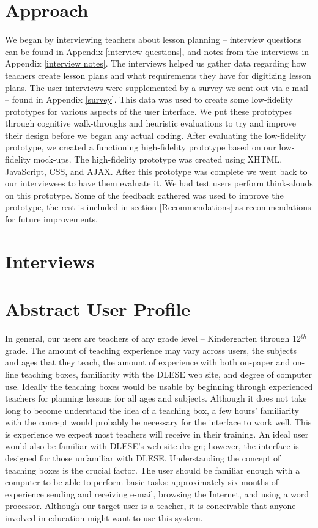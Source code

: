\documentclass[10pt,letter]{article}
\begin{document}
\section{Approach}
We began by interviewing teachers about lesson planning -- interview questions
can be found in Appendix \ref{interview questions}, and notes from the
interviews in Appendix \ref{interview notes}. The interviews helped us gather
data regarding how teachers create lesson plans and what requirements they have
for digitizing lesson plans. The user interviews were supplemented by a survey
we sent out via e-mail -- found in Appendix \ref{survey}. This data was used to
create some low-fidelity prototypes for various aspects of the user interface.
We put these prototypes through cognitive walk-throughs and heuristic
evaluations to try and improve their design before we began any actual coding.
After evaluating the low-fidelity prototype, we created a functioning
high-fidelity prototype based on our low-fidelity mock-ups. The high-fidelity
prototype was created using XHTML, JavaScript, CSS, and AJAX. After this
prototype was complete we went back to our interviewees to have them evaluate
it. We had test users perform think-alouds on this prototype. Some of the
feedback gathered was used to improve the prototype, the rest is included in
section \ref{Recommendations} as recommendations for future improvements.

\section{Interviews}


\section{Abstract User Profile}
In general, our users are teachers of any grade level -- Kindergarten through
12$^{th}$ grade. The amount of teaching experience may vary across users, the
subjects and ages that they teach, the amount of experience with both on-paper
and on-line teaching boxes, familiarity with the DLESE web site, and degree of
computer use.  Ideally the teaching boxes would be usable by beginning through
experienced teachers for planning lessons for all ages and subjects.  Although
it does not take long to become understand the idea of a teaching box, a few
hours' familiarity with the concept would probably be necessary for the
interface to work well.  This is experience we expect most teachers will receive
in their training.  An ideal user would also be familiar with DLESE's web site
design; however, the interface is designed for those unfamiliar with DLESE.
Understanding the concept of teaching boxes is the crucial factor.  The user
should be familiar enough with a computer to be able to perform basic tasks:
approximately six months of experience sending and receiving e-mail, browsing
the Internet, and using a word processor.  Although our target user is a
teacher, it is conceivable that anyone involved in education might want to use
this system.
\end{document}

